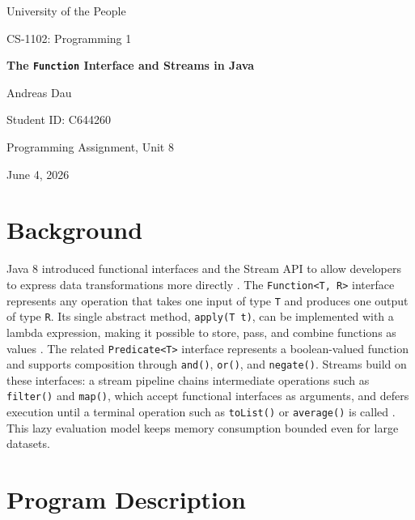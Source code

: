 \documentclass[12pt, a4paper]{article}
\begin{document}
	
	\begin{titlepage}
		\centering
		\vspace*{2cm}
		{\large University of the People \par}
		\vspace{0.5cm}
		{\large CS-1102: Programming 1 \par}
		\vspace{3cm}
		{\LARGE\bfseries The \texttt{Function} Interface and Streams in Java \par}
		\vspace{3cm}
		{\large Andreas Dau \par}
		{\large Student ID: C644260 \par}
		\vspace{1cm}
		{\large Programming Assignment, Unit 8 \par}
		\vspace{1cm}
		{\large June 4, 2026 \par}
		\vfill
	\end{titlepage}
	
	\section{Background}
	
	Java 8 introduced functional interfaces and the Stream API to allow developers
	to express data transformations more directly \cite{liang2020}. The
	\texttt{Function<T,\,R>} interface represents any operation that takes one input
	of type \texttt{T} and produces one output of type \texttt{R}. Its single
	abstract method, \texttt{apply(T t)}, can be implemented with a lambda expression,
	making it possible to store, pass, and combine functions as values
	\cite{urma2018}. The related \texttt{Predicate<T>} interface represents a
	boolean-valued function and supports composition through \texttt{and()},
	\texttt{or()}, and \texttt{negate()}. Streams build on these interfaces: a
	stream pipeline chains intermediate operations such as \texttt{filter()} and
	\texttt{map()}, which accept functional interfaces as arguments, and defers
	execution until a terminal operation such as \texttt{toList()} or
	\texttt{average()} is called \cite{goetz2006}. This lazy evaluation model keeps
	memory consumption bounded even for large datasets.
	
	\section{Program Description}
	
\end{document}
